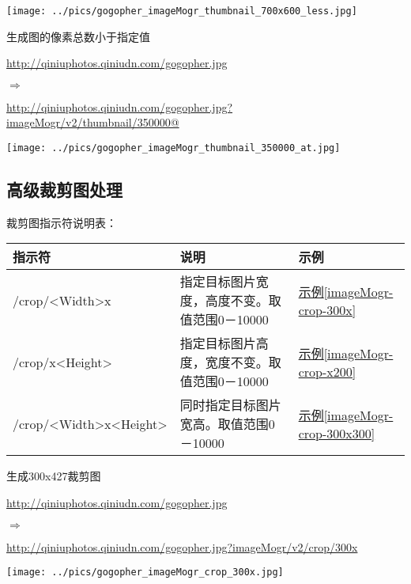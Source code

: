 \documentclass[11pt, oneside]{book}
\newcommand{\qpar}[1]{
\vspace{0.25em}
\noindent
#1\par
\vspace{0.25em}
}
\newcommand{\qurl}[1]{\url{#1}}
\newcommand{\qtable}[1]{\footnotesize\vspace{0.5em}#1\vspace{0.5em}\normalsize}
\begin{document}
\begin{CJK*}{UTF8}{song}
\begin{sample}
    \begin{center}
      \texttt{[image: ../pics/gogopher\_imageMogr\_thumbnail\_700x600\_less.jpg]}
    \end{center}
  \label{imageMogr-thumbnail-700x600-less}
\end{sample}

\begin{sample}
  \caption{生成图的像素总数小于指定值}
    \qpar{\qurl{http://qiniuphotos.qiniudn.com/gogopher.jpg}}
    \qpar{$\Rightarrow$}
    \qpar{\qurl{http://qiniuphotos.qiniudn.com/gogopher.jpg?imageMogr/v2/thumbnail/350000@}}

    \begin{center}
      \texttt{[image: ../pics/gogopher\_imageMogr\_thumbnail\_350000\_at.jpg]}
    \end{center}
  \label{imageMogr-thumbnail-350000-at}
\end{sample}

\subsection{高级裁剪图处理}

\qpar{裁剪图指示符说明表：}
\qtable{
\label{crop-spec}
\begin{tabular}[t]{|l|p{20em}|p{4em}|}
\hline
指示符 & 说明 & 示例 \\
\hline
/crop/\textless Width\textgreater x & 指定目标图片宽度，高度不变。取值范围0－10000 & \hyperref[imageMogr-crop-300x]{示例\ref*{imageMogr-crop-300x}} \\
\hline
/crop/x\textless Height\textgreater & 指定目标图片高度，宽度不变。取值范围0－10000 & \hyperref[imageMogr-crop-x200]{示例\ref*{imageMogr-crop-x200}} \\
\hline
/crop/\textless Width\textgreater x\textless Height\textgreater & 同时指定目标图片宽高。取值范围0－10000 & \hyperref[imageMogr-crop-300x300]{示例\ref*{imageMogr-crop-300x300}} \\
\hline
\end{tabular}
}

\begin{sample}
  \caption{生成300x427裁剪图}
    \qpar{\qurl{http://qiniuphotos.qiniudn.com/gogopher.jpg}}
    \qpar{$\Rightarrow$}
    \qpar{\qurl{http://qiniuphotos.qiniudn.com/gogopher.jpg?imageMogr/v2/crop/300x}}

    \begin{center}
      \texttt{[image: ../pics/gogopher\_imageMogr\_crop\_300x.jpg]}
    \end{center}
  \label{imageMogr-crop-300x}
\end{sample}


\end{CJK*}
\end{document}
